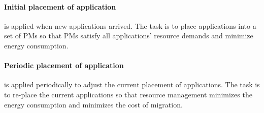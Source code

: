 \paragraph{Initial placement of application} is applied when new applications arrived. The task is to place applications into a set of PMs \cite{Mishra:2012kx} so that PMs satisfy all applications' resource demands and minimize energy consumption.



\paragraph{Periodic placement of application} is applied periodically to adjust the current placement of applications. The task is to re-place the current applications so that resource management minimizes the energy consumption and minimizes the cost of migration.




